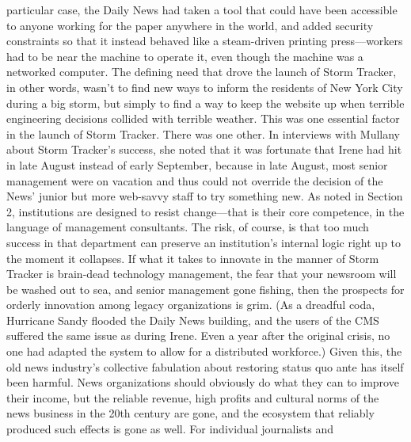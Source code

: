 particular case, the Daily News had taken a tool that could have been accessible
to anyone working for the paper anywhere in the world, and added security
constraints so that it instead behaved like a steam-driven printing press—workers
had to be near the machine to operate it, even though the machine was a
networked computer.
The defining need that drove the launch of Storm Tracker, in other words, wasn’t
to find new ways to inform the residents of New York City during a big storm,
but simply to find a way to keep the website up when terrible engineering decisions
collided with terrible weather.
This was one essential factor in the launch of Storm Tracker. There was one
other. In interviews with Mullany about Storm Tracker’s success, she noted that
it was fortunate that Irene had hit in late August instead of early September,
because in late August, most senior management were on vacation and thus
could not override the decision of the News’ junior but more web-savvy staff
to try something new.
As noted in Section 2, institutions are designed to resist change—that is their
core competence, in the language of management consultants. The risk, of
course, is that too much success in that department can preserve an institution’s
internal logic right up to the moment it collapses. If what it takes to innovate
in the manner of Storm Tracker is brain-dead technology management, the fear
that your newsroom will be washed out to sea, and senior management gone
fishing, then the prospects for orderly innovation among legacy organizations
is grim. (As a dreadful coda, Hurricane Sandy flooded the Daily News building,
and the users of the CMS suffered the same issue as during Irene. Even
a year after the original crisis, no one had adapted the system to allow for a
distributed workforce.)
Given this, the old news industry’s collective fabulation about restoring status
quo ante has itself been harmful. News organizations should obviously do what
they can to improve their income, but the reliable revenue, high profits and cultural
norms of the news business in the 20th century are gone, and the ecosystem
that reliably produced such effects is gone as well. For individual journalists and

